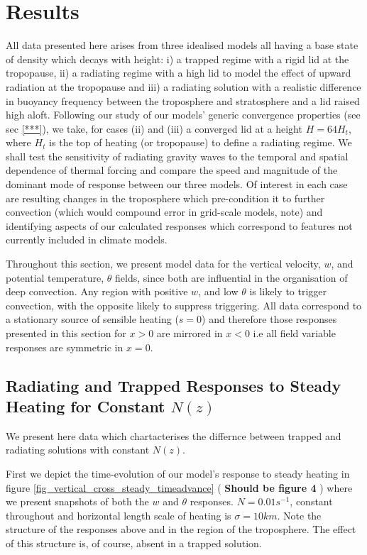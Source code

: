 \documentclass[a4paper,10pt]{article}
\begin{document}
\section{Results}
\label{sec_results}

%
All data presented here arises from three idealised models all having a base state of density which decays with height: i) a trapped regime with a rigid lid at the tropopause, ii) a radiating regime with a high lid to model the effect of upward radiation at the tropopause and iii) a radiating solution with a realistic difference in buoyancy frequency between the troposphere and stratosphere and a lid raised high aloft. Following our study of our models' generic convergence properties (see sec \ref{***}), we take, for cases (ii) and (iii) a converged lid at a height $H = 64 H_t$, where $H_t$ is the top of heating (or tropopause) to define a radiating regime. We shall test the sensitivity of radiating gravity waves to the temporal and spatial dependence of thermal forcing and compare the speed and magnitude of the dominant mode of response between our three models. Of interest in each case are resulting changes in the troposphere which pre-condition it to further convection (which would compound error in grid-scale models, note) and identifying aspects of our calculated responses which correspond to features not currently included in climate models.

Throughout this section, we present model data for the vertical velocity, $w$, and potential temperature, $\theta$ fields, since both are influential in the organisation of deep convection. Any region with positive $w$, and low $\theta$ is likely to trigger convection, with the opposite likely to suppress triggering. All data correspond to a stationary source of sensible heating ($s = 0$) and therefore those responses presented in this section for $x > 0 $ are mirrored in $x < 0$ i.e all field variable responses are symmetric in $x = 0$.
%
%
%
\subsection{Radiating and Trapped Responses to Steady Heating for Constant $N(z)$}
\label{sec_results_uniform}
%
We present here data which chartacterises the differnce between trapped and radiating solutions with constant $N(z)$.

First we depict the time-evolution of our model's response to steady heating in figure 
\ref{fig_vertical_cross_steady_timeadvance} ({ \bf Should be figure 4} ) where we present snapshots of both the $w$ and $\theta$ responses. $N= 0.01s^{-1}$, constant throughout and horizontal length scale of heating is $\sigma = 10km$.
Note the structure of the responses above and in the region of the troposphere. The effect of this 
structure is, of course, absent in a trapped solution.
\end{document}
